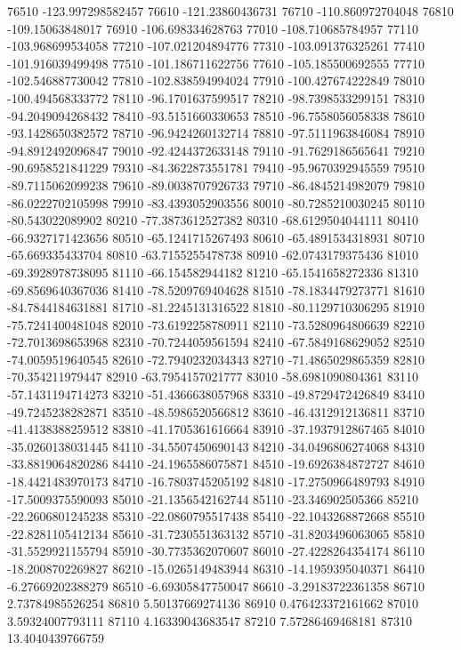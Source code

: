 {76510 -123.997298582457
76610 -121.23860436731
76710 -110.860972704048
76810 -109.15063848017
76910 -106.698334628763
77010 -108.710685784957
77110 -103.968699534058
77210 -107.021204894776
77310 -103.091376325261
77410 -101.916039499498
77510 -101.186711622756
77610 -105.185500692555
77710 -102.546887730042
77810 -102.838594994024
77910 -100.427674222849
78010 -100.494568333772
78110 -96.1701637599517
78210 -98.7398533299151
78310 -94.2049094268432
78410 -93.5151660330653
78510 -96.7558056058338
78610 -93.1428650382572
78710 -96.9424260132714
78810 -97.5111963846084
78910 -94.8912492096847
79010 -92.4244372633148
79110 -91.7629186565641
79210 -90.6958521841229
79310 -84.3622873551781
79410 -95.9670392945559
79510 -89.7115062099238
79610 -89.0038707926733
79710 -86.4845214982079
79810 -86.0222702105998
79910 -83.4393052903556
80010 -80.7285210030245
80110 -80.543022089902
80210 -77.3873612527382
80310 -68.6129504044111
80410 -66.9327171423656
80510 -65.1241715267493
80610 -65.4891534318931
80710 -65.669335433704
80810 -63.7155255478738
80910 -62.0743179375436
81010 -69.3928978738095
81110 -66.154582944182
81210 -65.1541658272336
81310 -69.8569640367036
81410 -78.5209769404628
81510 -78.1834479273771
81610 -84.7844184631881
81710 -81.2245131316522
81810 -80.1129710306295
81910 -75.7241400481048
82010 -73.6192258780911
82110 -73.5280964806639
82210 -72.7013698653968
82310 -70.7244059561594
82410 -67.5849168629052
82510 -74.0059519640545
82610 -72.7940232034343
82710 -71.4865029865359
82810 -70.354211979447
82910 -63.7954157021777
83010 -58.6981090804361
83110 -57.1431194714273
83210 -51.4366638057968
83310 -49.8729472426849
83410 -49.7245238282871
83510 -48.5986520566812
83610 -46.4312912136811
83710 -41.4138388259512
83810 -41.1705361616664
83910 -37.1937912867465
84010 -35.0260138031445
84110 -34.5507450690143
84210 -34.0496806274068
84310 -33.8819064820286
84410 -24.1965586075871
84510 -19.6926384872727
84610 -18.4421483970173
84710 -16.7803745205192
84810 -17.2750966489793
84910 -17.5009375590093
85010 -21.1356542162744
85110 -23.346902505366
85210 -22.2606801245238
85310 -22.0860795517438
85410 -22.1043268872668
85510 -22.8281105412134
85610 -31.7230551363132
85710 -31.8203496063065
85810 -31.5529921155794
85910 -30.7735362070607
86010 -27.4228264354174
86110 -18.2008702269827
86210 -15.0265149483944
86310 -14.1959395040371
86410 -6.27669202388279
86510 -6.69305847750047
86610 -3.29183722361358
86710 2.73784985526254
86810 5.50137669274136
86910 0.476423372161662
87010 3.59324007793111
87110 4.16339043683547
87210 7.57286469468181
87310 13.4040439766759
}
